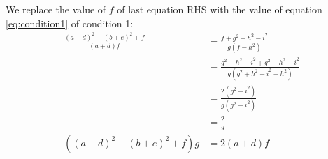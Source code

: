 \documentclass[11pt]{article}
\begin{document}
We replace the value of $f$ of last equation RHS with the value of equation \ref{eq:condition1}
of condition 1:
\begin{align}
\frac{(a+d)^2 - (b+e)^2 + f}{(a+d)f} &= \frac{f + g^2 - h^2 - i^2}{g(f-h^2)} \nonumber\\
 &= \frac{g^2 + h^2 - i^2 + g^2 - h^2 - i^2}{g(g^2 + h^2 - i^2-h^2)} \nonumber\\
 &= \frac{2(g^2 - i^2)}{g(g^2 - i^2)} \nonumber\\
 &= \frac{2}{g} \nonumber\\
((a+d)^2 - (b+e)^2 + f)g &= 2(a+d)f \label{eq:condition2}
\end{align}
\end{document}

